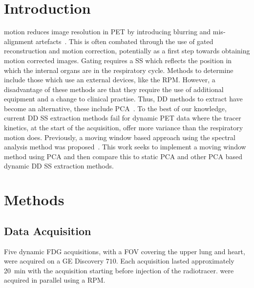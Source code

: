 \section{Introduction} \label{sec:introduction}
     motion reduces image resolution in \gls{PET} by introducing blurring and mis-alignment artefacts~\cite{Nehmeh2008a}. This is often combated through the use of gated reconstruction and motion correction, potentially as a first step towards obtaining motion corrected images. Gating requires a \gls{SS} which reflects the position in which the internal organs are in the respiratory cycle. Methods to determine  include those which use an external devices, like the \gls{RPM}. However, a disadvantage of these methods are that they require the use of additional equipment and a change to clinical practise. Thus, \gls{DD} methods to extract  have become an alternative, these include \gls{PCA}~\cite{Thielemans2011}. To the best of our knowledge, current \gls{DD} \gls{SS} extraction methods fail for dynamic \gls{PET} data where the tracer kinetics, at the start of the acquisition, offer more variance than the respiratory motion does. Previously, a moving window based approach using the spectral analysis method was proposed~\cite{Schleyer2014}. This work seeks to implement a moving window method using \gls{PCA} and then compare this to static \gls{PCA} and other \gls{PCA} based dynamic \gls{DD} \gls{SS} extraction methods.
    
\vspace{-0.0cm}

\section{Methods} \label{sec:methods}
    \subsection{Data Acquisition} \label{sec:data_acquisition}
        Five dynamic \gls{FDG} acquisitions, with a \gls{FOV} covering the upper lung and heart, were acquired on a \gls{GE} Discovery $710$. Each acquisition lasted approximately \SI{20}{\minute} with the acquisition starting before injection of the radiotracer.  were acquired in parallel using a \gls{RPM}.
        
    \vspace{-0.5cm}
        
